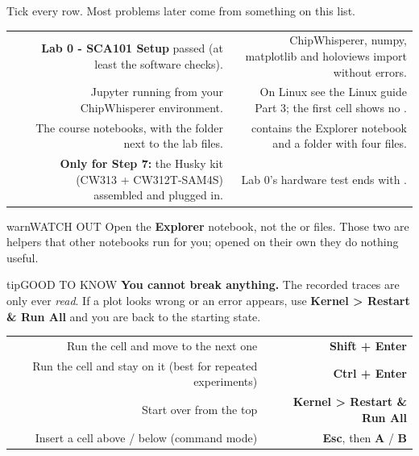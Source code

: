 \documentclass[11pt,letterpaper]{article}
\begin{document}
\clearpage


Tick every row. Most problems later come from something on this list.

{\small{}
\begin{longtable}{|R{0.0652}|R{0.4783}|R{0.4565}|}
\hline
{}\hdrcell{} &  &  \\ \hline
\endhead
[  ] & \textbf{Lab 0 - SCA101 Setup} passed (at least the software checks). & ChipWhisperer, numpy, matplotlib and holoviews import without errors. \\ \hline
[  ] & Jupyter running from your ChipWhisperer environment. & On Linux see the Linux guide Part 3; the first cell shows no . \\ \hline
[  ] & The course notebooks, with the  folder next to the lab files. &  contains the Explorer notebook and a  folder with four  files. \\ \hline
[  ] & \textbf{Only for Step 7:} the Husky kit (CW313 + CW312T-SAM4S) assembled and plugged in. & Lab 0's hardware test ends with . \\ \hline
\end{longtable}}

\vspace{4pt}

\begin{guidecallout}{warn}{WATCH OUT}
Open the \textbf{Explorer} notebook, not the  or  files. Those two are helpers that
other notebooks run for you; opened on their own they do nothing useful.
\end{guidecallout}

\begin{guidecallout}{tip}{GOOD TO KNOW}
\textbf{You cannot break anything.} The recorded traces are only ever \emph{read}. If a plot looks wrong or an error
appears, use \textbf{Kernel \textgreater{} Restart \& Run All} and you are back to the starting state.
\end{guidecallout}


{\small{}
\begin{longtable}{|R{0.6667}|R{0.3333}|}
\hline
{} &  \\ \hline
\endhead
Run the cell and move to the next one & \textbf{Shift + Enter} \\ \hline
Run the cell and stay on it (best for repeated experiments) & \textbf{Ctrl + Enter} \\ \hline
Start over from the top & \textbf{Kernel \textgreater{} Restart \& Run All} \\ \hline
Insert a cell above / below (command mode) & \textbf{Esc}, then \textbf{A} / \textbf{B} \\ \hline
\end{longtable}}
\end{document}

